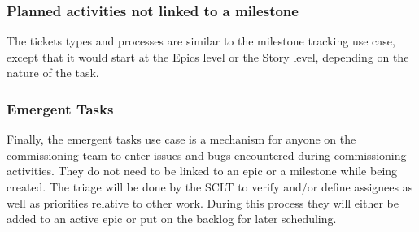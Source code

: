 \documentclass[SE,authoryear,toc]{lsstdoc}
\begin{document}
\subsubsection{Planned activities not linked to a milestone}
The tickets types and processes are similar to the milestone tracking use case, except that it would start at the Epics level or the Story level, depending on the nature of the task. 

\subsubsection{Emergent Tasks}
Finally, the emergent tasks use case is a mechanism for anyone on the commissioning team to enter issues and bugs encountered during commissioning activities. 
They do not need to be linked to an epic or a milestone while being created. 
The triage will be done by the SCLT to verify and/or define assignees as well as priorities relative to other work. During this process they will either be added to an active epic or put on the backlog for later scheduling.
\end{document}
